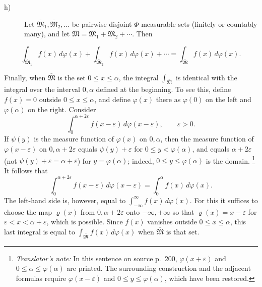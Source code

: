 \documentclass[12pt,b5paper,twoside]{article}
\newcommand{\translatorfootnote}[2]{%
  \begingroup
  \renewcommand{\thefootnote}{#1}%
  \footnote{\hspace{0.8em}\textit{Translator's note:} #2}%
  \endgroup}
\begin{document}
\begin{description}
 \item[\textup{h)}]\label{prop:I.4.h}
 Let $\overline{\mathfrak M}_1,\overline{\mathfrak M}_2,\ldots$ be pairwise disjoint $\Phi$-measurable sets (finitely or countably many), and let $\overline{\mathfrak M}=\overline{\mathfrak M}_1+\overline{\mathfrak M}_2+\cdots$. Then
\end{description}

\label{eq:LS-countable-additivity}
\begin{equation*}
 \int_{\overline{\mathfrak M}_1}f(x)\,d\varphi(x)
 +\int_{\overline{\mathfrak M}_2}f(x)\,d\varphi(x)+\cdots
 =\int_{\overline{\mathfrak M}}f(x)\,d\varphi(x).
\end{equation*}

Finally, when $\overline{\mathfrak M}$ is the set $0\leq x\leq\alpha$, the integral $\int_{\overline{\mathfrak M}}$ is identical with the integral over the interval $0,\alpha$ defined at the beginning. To see this, define $f(x)=0$ outside $0\leq x\leq\alpha$, and define $\varphi(x)$ there as $\varphi(0)$ on the left and $\varphi(\alpha)$ on the right. Consider
\[
 \int_0^{\alpha+2\varepsilon}f(x-\varepsilon)\,d\varphi(x-\varepsilon),
 \qquad \varepsilon>0.
\]
If $\psi(y)$ is the measure function of $\varphi(x)$ on $0,\alpha$, then the measure
function of $\varphi(x-\varepsilon)$ on $0,\alpha+2\varepsilon$ equals
$\psi(y)+\varepsilon$ for $0\leq y<\varphi(\alpha)$, and equals
$\alpha+2\varepsilon$ (not $\psi(y)+\varepsilon=\alpha+\varepsilon$) for
$y=\varphi(\alpha)$; indeed, $0\leq y\leq\varphi(\alpha)$ is the
 domain.\translatorfootnote{T3}{In this sentence on source p.~200,
$\varphi(x+\varepsilon)$ and $0\leq\alpha\leq\varphi(\alpha)$ are printed.  The
surrounding construction and the adjacent formulas require
$\varphi(x-\varepsilon)$ and $0\leq y\leq\varphi(\alpha)$, which have been restored.}
It follows that
\label{eq:LS-finite-line-agreement}
\begin{equation*}
 \int_0^{\alpha+2\varepsilon}f(x-\varepsilon)\,d\varphi(x-\varepsilon)
 =\int_0^\alpha f(x)\,d\varphi(x).
\end{equation*}
The left-hand side is, however, equal to $\int_{-\infty}^{\infty}f(x)\,d\varphi(x)$. For this it suffices to choose the map $\varrho(x)$ from $0,\alpha+2\varepsilon$ onto $-\infty,+\infty$ so that $\varrho(x)=x-\varepsilon$ for $\varepsilon<x<\alpha+\varepsilon$, which is possible. Since $f(x)$ vanishes outside $0\leq x\leq\alpha$, this last integral is equal to $\int_{\overline{\mathfrak M}}f(x)\,d\varphi(x)$ when $\overline{\mathfrak M}$ is that set.
\end{document}
